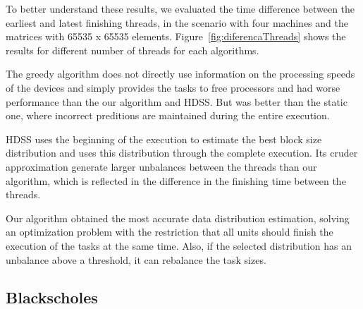 \documentclass[journal]{IEEEtran}
\begin{document}

%
To better understand these results, we evaluated the time difference between the
earliest and latest finishing threads, in the scenario with four machines and
the matrices with 65535 x 65535 elements. Figure~\ref{fig:diferencaThreads}
shows the results for different number of threads for each algorithms.

The greedy algorithm does not directly use information on the processing speeds
of the devices and simply provides the tasks to free processors and had worse
performance than the our algorithm and HDSS. But was better than the static one,
where incorrect preditions are maintained during the entire execution.

HDSS uses the beginning of the execution to estimate the best block size
distribution and uses this distribution through the complete execution. Its
cruder approximation generate larger unbalances between the threads than our
algorithm, which is reflected in the difference in the finishing time between
the threads.

Our algorithm obtained the most accurate data distribution estimation, solving
an optimization problem with the restriction that all units should finish the
execution of the tasks at the same time. Also, if the selected distribution has
an unbalance above a threshold, it can rebalance the task sizes.

\subsection{Blackscholes}
\end{document}
